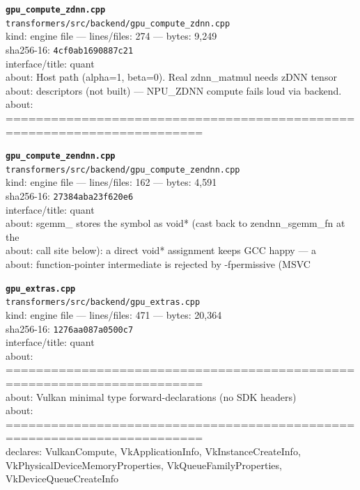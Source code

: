 \noindent\textbf{\texttt{gpu\_compute\_zdnn.cpp}}\\
\texttt{transformers/src/backend/gpu\_compute\_zdnn.cpp}\\
kind: engine file --- lines/files: 274 --- bytes: 9,249\\
sha256-16: \texttt{4cf0ab1690887c21}\\
interface/title: quant\\
about: Host path (alpha=1, beta=0). Real zdnn\_matmul needs zDNN tensor\\
about: descriptors (not built) — NPU\_ZDNN compute fails loud via backend.\\
about: ========================================================================\\
\vspace*{6.0pt}

\noindent\textbf{\texttt{gpu\_compute\_zendnn.cpp}}\\
\texttt{transformers/src/backend/gpu\_compute\_zendnn.cpp}\\
kind: engine file --- lines/files: 162 --- bytes: 4,591\\
sha256-16: \texttt{27384aba23f620e6}\\
interface/title: quant\\
about: sgemm\_ stores the symbol as void* (cast back to zendnn\_sgemm\_fn at the\\
about: call site below): a direct void* assignment keeps GCC happy — a\\
about: function-pointer intermediate is rejected by -fpermissive (MSVC\\
\vspace*{6.0pt}

\noindent\textbf{\texttt{gpu\_extras.cpp}}\\
\texttt{transformers/src/backend/gpu\_extras.cpp}\\
kind: engine file --- lines/files: 471 --- bytes: 20,364\\
sha256-16: \texttt{1276aa087a0500c7}\\
interface/title: quant\\
about: ========================================================================\\
about: Vulkan minimal type forward-declarations (no SDK headers)\\
about: ========================================================================\\
declares: VulkanCompute, VkApplicationInfo, VkInstanceCreateInfo, VkPhysicalDeviceMemoryProperties, VkQueueFamilyProperties, VkDeviceQueueCreateInfo\\
\vspace*{6.0pt}

